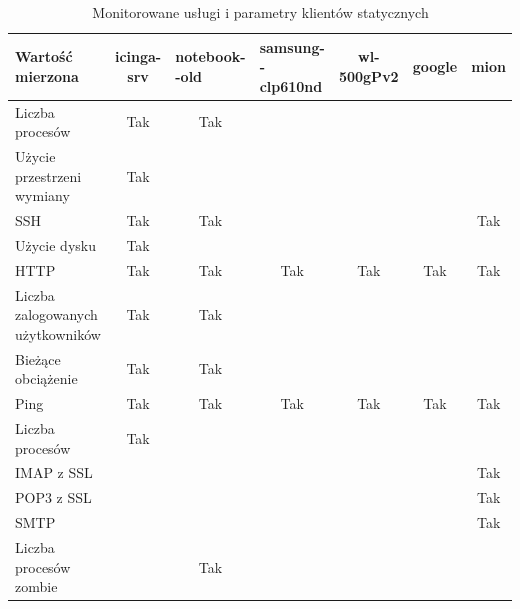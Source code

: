 \begin{table}
\centering
\caption{Monitorowane usługi i parametry klientów statycznych}
\label{tab:hostServiceStatic}
\begin{tabular}{|p{2.5cm}|c|p{2cm}|p{2cm}|c|c|c|}
\hline
\raggedright{Wartość mierzona} & icinga-srv & \raggedright{notebook- -old} & \raggedright{samsung- -clp610nd} & wl-500gPv2 & google & mion \\
\hline
\raggedright{Liczba procesów} & \multicolumn{1}{|c|}{Tak} & \multicolumn{1}{|c|}{Tak}  &   &  &  &  \\
\hline

\raggedright{Użycie przestrzeni wymiany} & \multicolumn{1}{|c|}{Tak} &  &  &  &  &  \\
\hline

SSH & \multicolumn{1}{|c|}{Tak} & \multicolumn{1}{|c|}{Tak} &  &  &  & \multicolumn{1}{|c|}{Tak} \\
\hline

Użycie dysku & \multicolumn{1}{|c|}{Tak} &  &  &  &  &  \\
\hline

HTTP & \multicolumn{1}{|c|}{Tak} & \multicolumn{1}{|c|}{Tak} & \multicolumn{1}{|c|}{Tak} & \multicolumn{1}{|c|}{Tak} & \multicolumn{1}{|c|}{Tak} & \multicolumn{1}{|c|}{Tak} \\
\hline

\raggedright{Liczba zalogowanych użytkowników} & \multicolumn{1}{|c|}{Tak} & \multicolumn{1}{|c|}{Tak} &  &  &  &  \\
\hline

\raggedright{Bieżące obciążenie} & \multicolumn{1}{|c|}{Tak} & \multicolumn{1}{|c|}{Tak} &  &  &  &  \\
\hline

Ping & \multicolumn{1}{|c|}{Tak} & \multicolumn{1}{|c|}{Tak} & \multicolumn{1}{|c|}{Tak} & \multicolumn{1}{|c|}{Tak} & \multicolumn{1}{|c|}{Tak} & \multicolumn{1}{|c|}{Tak} \\
\hline

\raggedright{Liczba procesów} & \multicolumn{1}{|c|}{Tak} &  &  &  &  &  \\
\hline

IMAP z SSL &  &  &  &  &  & \multicolumn{1}{|c|}{Tak} \\
\hline

POP3 z SSL &  &  &  &  &  & \multicolumn{1}{|c|}{Tak} \\
\hline

SMTP &  &  &  &  &  & \multicolumn{1}{|c|}{Tak} \\
\hline

\raggedright{Liczba procesów zombie} &  & \multicolumn{1}{|c|}{Tak} &  &  &  &  \\
\hline
\end{tabular}
\end{table} 


